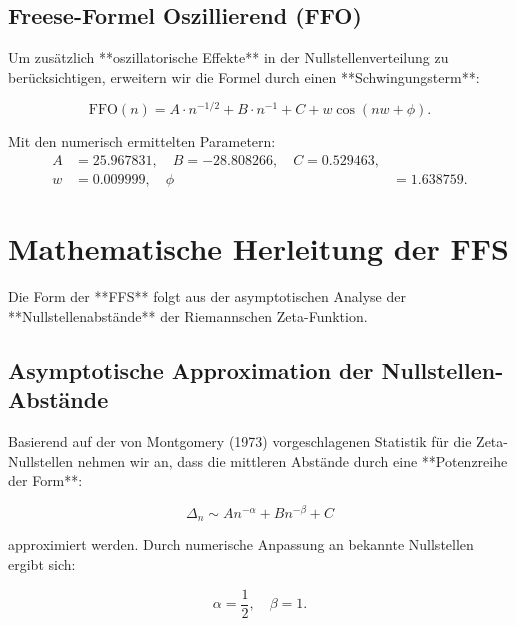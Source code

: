 \documentclass[a4paper,12pt]{article}
\begin{document}
\subsection{Freese-Formel Oszillierend (FFO)}
Um zusätzlich **oszillatorische Effekte** in der Nullstellenverteilung zu berücksichtigen, erweitern wir die Formel durch einen **Schwingungsterm**:

\begin{equation}
    \text{FFO}(n) = A \cdot n^{-1/2} + B \cdot n^{-1} + C + w \cos(nw + \phi).
\end{equation}

Mit den numerisch ermittelten Parametern:
\begin{align*}
    A &= 25.967831, \quad B = -28.808266, \quad C = 0.529463, \\
    w &= 0.009999, \quad \phi &= 1.638759.
\end{align*}

\newpage

\section{Mathematische Herleitung der FFS}

Die Form der **FFS** folgt aus der asymptotischen Analyse der **Nullstellenabstände** der Riemannschen Zeta-Funktion.

\subsection{Asymptotische Approximation der Nullstellen-Abstände}
Basierend auf der von Montgomery (1973) vorgeschlagenen Statistik für die Zeta-Nullstellen nehmen wir an, dass die mittleren Abstände durch eine **Potenzreihe der Form**:

\begin{equation}
    \Delta_n \sim A n^{-\alpha} + B n^{-\beta} + C
\end{equation}

approximiert werden. Durch numerische Anpassung an bekannte Nullstellen ergibt sich:

\begin{equation}
    \alpha = \frac{1}{2}, \quad \beta = 1.
\end{equation}

\newpage

\end{document}
